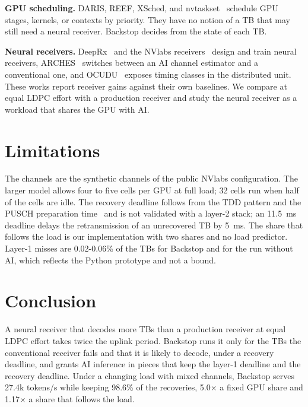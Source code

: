 \documentclass[acmsmall,screen,review,anonymous]{acmart}
\newcommand{\sys}{Backstop\xspace}
\begin{document}
\noindent\textbf{GPU scheduling.} DARIS, REEF, XSched, and nvtaskset~\cite{daris,reef,xsched,nvtaskset}
schedule GPU stages, kernels, or contexts by priority. They have no notion of a TB that may still need a
neural receiver. \sys decides from the state of each TB.

\noindent\textbf{Neural receivers.} DeepRx~\cite{deeprx} and the NVlabs receivers~\cite{nrx5g,nrxrt} design
and train neural receivers, ARCHES~\cite{arches} switches between an AI channel estimator and a conventional
one, and OCUDU~\cite{ocudu} exposes timing classes in the distributed unit. These works report receiver
gains against their own baselines. We compare at equal LDPC effort with a production receiver and study the
neural receiver as a workload that shares the GPU with AI.

\section{Limitations}

The channels are the synthetic channels of the public NVlabs configuration. The larger model allows four to
five cells per GPU at full load; 32 cells run when half of the cells are idle. The recovery deadline follows
from the TDD pattern and the PUSCH preparation time~\cite{ts38214} and is not validated with a layer-2
stack; an 11.5~ms deadline delays the retransmission of an unrecovered TB by 5~ms. The share that follows the
load is our implementation with two shares and no load predictor. Layer-1 misses are 0.02-0.06\% of the TBs
for \sys and for the run without AI, which reflects the Python prototype and not a bound.

\section{Conclusion}

A neural receiver that decodes more TBs than a production receiver at equal LDPC effort takes twice the
uplink period. \sys runs it only for the TBs the conventional receiver fails and that it is likely to
decode, under a recovery deadline, and grants AI inference in pieces that keep the layer-1 deadline and the
recovery deadline. Under a changing load with mixed channels, \sys serves 27.4k tokens/s while keeping
98.6\% of the recoveries, 5.0$\times$ a fixed GPU share and 1.17$\times$ a share that follows the load.



\end{document}
